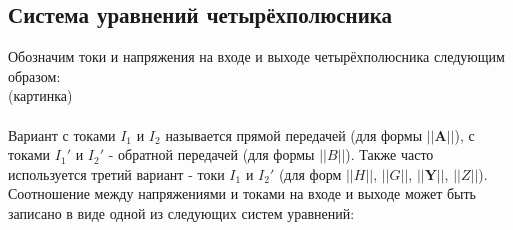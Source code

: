 \documentclass[a4paper,12pt]{report}
\begin{document}
\subsection{Система уравнений четырёхполюсника}
Обозначим токи и напряжения на входе и выходе четырёхполюсника следующим образом:\\
(картинка)\\
\\
Вариант с токами $I_1$ и $I_2$ называется прямой передачей (для формы $||\textbf{A}||$), с токами $I_1'$ и $I_2'$ - обратной передачей (для формы $||B||$). Также часто используется третий вариант - токи $I_1$ и $I_2'$ (для форм $||H||$, $||G||$, $||\textbf{Y}||$, $||Z||$).\\
Соотношение между напряжениями и токами на входе и выходе может быть записано в виде одной из следующих систем уравнений:
\end{document}
